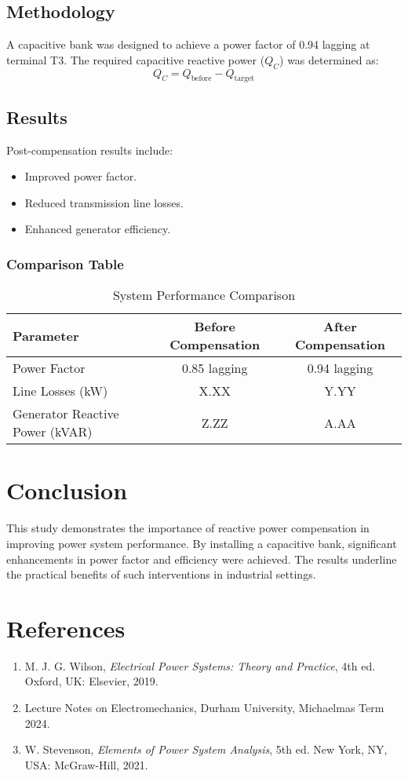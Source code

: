 \documentclass[conference]{IEEEtran}
\begin{document}
\subsection{Methodology}
A capacitive bank was designed to achieve a power factor of 0.94 lagging at terminal T3. The required capacitive reactive power ($Q_C$) was determined as:
\begin{equation}
Q_C = Q_{\text{before}} - Q_{\text{target}}
\end{equation}

\subsection{Results}
Post-compensation results include:
\begin{itemize}
    \item Improved power factor.
    \item Reduced transmission line losses.
    \item Enhanced generator efficiency.
\end{itemize}

\subsubsection{Comparison Table}
\begin{table}[H]
\caption{System Performance Comparison}
\centering
\begin{tabular}{@{}lcc@{}}
\toprule
Parameter & Before Compensation & After Compensation \\ \midrule
Power Factor & 0.85 lagging & 0.94 lagging \\
Line Losses (kW) & X.XX & Y.YY \\
Generator Reactive Power (kVAR) & Z.ZZ & A.AA \\ \bottomrule
\end{tabular}
\end{table}

\section{Conclusion}
This study demonstrates the importance of reactive power compensation in improving power system performance. By installing a capacitive bank, significant enhancements in power factor and efficiency were achieved. The results underline the practical benefits of such interventions in industrial settings.

\section*{References}
\begin{enumerate}
    \item M. J. G. Wilson, \textit{Electrical Power Systems: Theory and Practice}, 4th ed. Oxford, UK: Elsevier, 2019.
    \item Lecture Notes on Electromechanics, Durham University, Michaelmas Term 2024.
    \item W. Stevenson, \textit{Elements of Power System Analysis}, 5th ed. New York, NY, USA: McGraw-Hill, 2021.
\end{enumerate}
\end{document}
